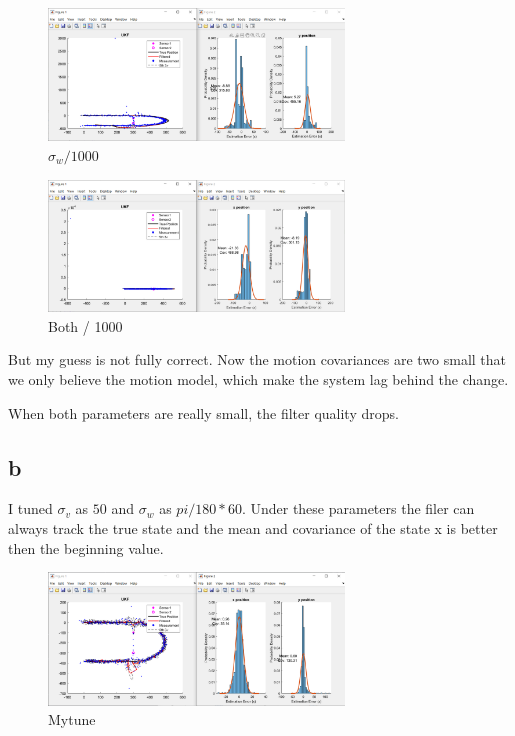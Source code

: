 \begin{figure}[H]
 \centering
 \includegraphics[width=0.7\textwidth]{images/1e-3sigamw.png}
 \caption{$\sigma_w/1000$}
 \label{1e-3sigamw}
\end{figure}

\begin{figure}[H]
 \centering
 \includegraphics[width=0.7\textwidth]{images/both1e-3.png}
 \caption{Both / 1000}
 \label{both1e-3}
\end{figure}

But my guess is not fully correct. Now the motion covariances are two small that we only believe the motion model, which make the system lag behind the change.

When both parameters are really small, the filter quality drops.

\subsection{b}
I tuned $\sigma_v$ as $50$ and $\sigma_w$ as $pi/180*60$. Under these parameters the filer can always track the true state and the mean and covariance of the state x is better then the beginning value.
\begin{figure}[H]
 \centering
 \includegraphics[width=0.7\textwidth]{images/mytune.png}
 \caption{Mytune}
 \label{mytune}
\end{figure}

